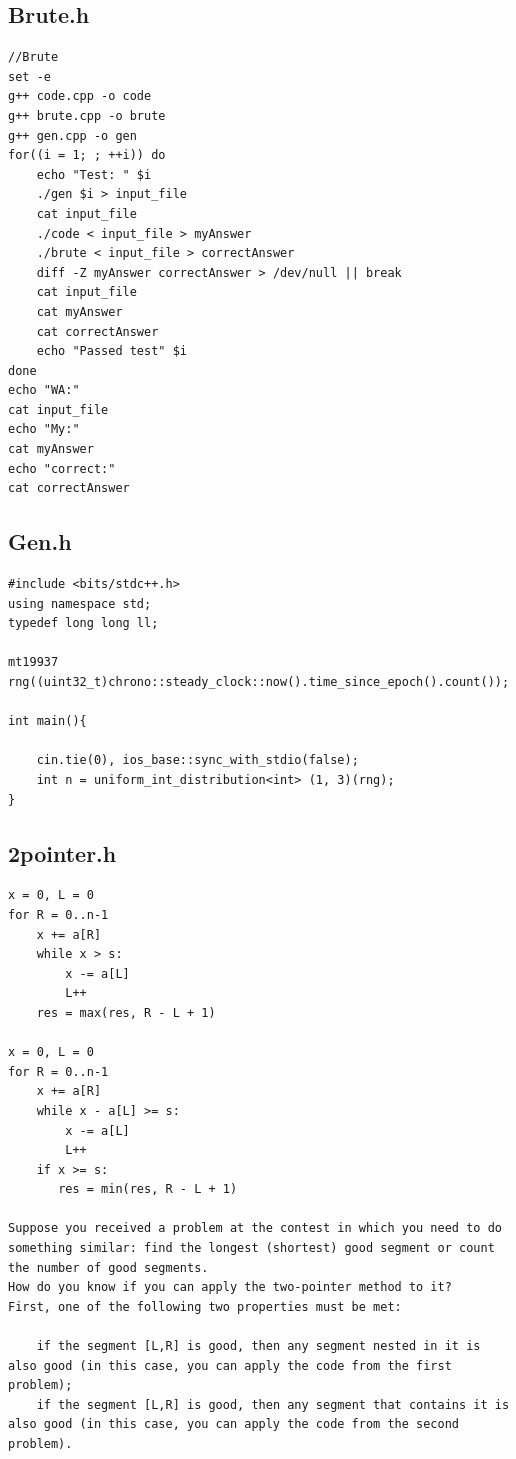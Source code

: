 \documentclass[9pt, a4paper, notitlepage]{extreport}
\begin{document}
\begin{multicols}{3}
\subsection{Brute.h}
\begin{verbatim}
//Brute
set -e
g++ code.cpp -o code
g++ brute.cpp -o brute
g++ gen.cpp -o gen
for((i = 1; ; ++i)) do
    echo "Test: " $i
    ./gen $i > input_file
    cat input_file
    ./code < input_file > myAnswer
    ./brute < input_file > correctAnswer
    diff -Z myAnswer correctAnswer > /dev/null || break
    cat input_file
    cat myAnswer
    cat correctAnswer
    echo "Passed test" $i
done
echo "WA:"
cat input_file
echo "My:"
cat myAnswer
echo "correct:"
cat correctAnswer
\end{verbatim}

\subsection{Gen.h}
\begin{verbatim}
#include <bits/stdc++.h>
using namespace std;
typedef long long ll;

mt19937 rng((uint32_t)chrono::steady_clock::now().time_since_epoch().count());

int main(){

    cin.tie(0), ios_base::sync_with_stdio(false);
    int n = uniform_int_distribution<int> (1, 3)(rng);
}
\end{verbatim}

\subsection{2pointer.h}
\begin{verbatim}
x = 0, L = 0 
for R = 0..n-1
    x += a[R]
    while x > s:
        x -= a[L]
        L++
    res = max(res, R - L + 1)

x = 0, L = 0
for R = 0..n-1
    x += a[R]
    while x - a[L] >= s:
        x -= a[L]
        L++
    if x >= s:
       res = min(res, R - L + 1)

Suppose you received a problem at the contest in which you need to do something similar: find the longest (shortest) good segment or count the number of good segments.
How do you know if you can apply the two-pointer method to it?
First, one of the following two properties must be met:

    if the segment [L,R] is good, then any segment nested in it is also good (in this case, you can apply the code from the first problem);
    if the segment [L,R] is good, then any segment that contains it is also good (in this case, you can apply the code from the second problem). 


\end{verbatim}
\end{multicols}
\end{document}
